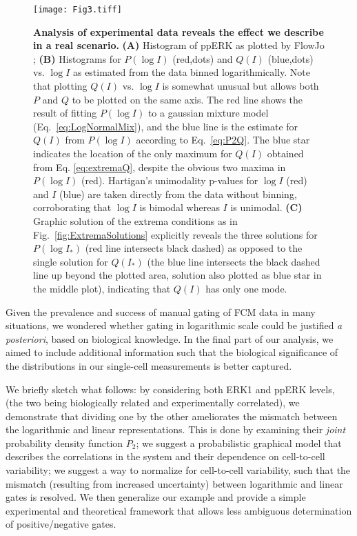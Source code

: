 \documentclass[11pt,a4paper,draft]{article}
\begin{document}
\begin{figure}[!ht]
 \centering
  \texttt{[image: Fig3.tiff]}
  \caption{\textbf{Analysis of experimental data reveals the effect we describe in a real scenario. }\textbf{(A)} Histogram of ppERK as plotted by FlowJo \cite{FlowJo}; \textbf{(B)} Histograms for $P(\log I)$ (red,dots) and $Q(I)$ (blue,dots) vs. $\log I$ as estimated from the data binned logarithmically. Note that plotting $Q(I)$ vs. $\log I$ is somewhat unusual but allows both $P$ and $Q$ to be plotted on the same axis. The red line shows the result of fitting $P(\log I)$ to a gaussian mixture model (Eq.~\ref{eq:LogNormalMix}), and the blue line is the estimate for $Q(I)$ from $P(\log I)$ according to Eq.~\ref{eq:P2Q}. The blue star indicates the location of the only maximum for $Q(I)$ obtained from Eq. \ref{eq:extremaQ}, despite the obvious two maxima in $P(\log I)$ (red). Hartigan's unimodality p-values for $\log I$ (red) and $I$ (blue) are taken directly from the data without binning, corroborating that $\log I$ is bimodal whereas $I$ is unimodal. \textbf{(C)} Graphic solution of the extrema conditions as in Fig.~\ref{fig:ExtremaSolutions} explicitly reveals the three solutions for $P(\log I_*)$ (red line intersects black dashed) as opposed to the single solution for $Q(I_*)$ (the blue line intersects the black dashed line up beyond the plotted area, solution also plotted as blue star in the middle plot), indicating that $Q(I)$ has only one mode.}
  \label{fig:Experiment}
\end{figure}
Given the prevalence and success of manual gating of FCM data in many situations, we wondered whether gating in logarithmic scale could be justified \emph{a posteriori}, based on biological knowledge. In the final part of our analysis, we aimed to include additional information such that the biological significance of the distributions in our single-cell measurements is better captured. 

\smallskip
We briefly sketch what follows: by considering both ERK1 and ppERK levels, (the two being biologically related and experimentally correlated), we demonstrate that dividing one by the other ameliorates the mismatch between the logarithmic and linear representations. This is done by examining their \emph{joint} probability density function $P_2$; we suggest a probabilistic graphical model that describes the correlations in the system and their dependence on cell-to-cell variability; we suggest a way to normalize for cell-to-cell variability, such that the mismatch (resulting from increased uncertainty) between logarithmic and linear gates is resolved. We then generalize our example and provide a simple experimental and theoretical framework that allows less ambiguous determination of positive/negative gates. 
\end{document}
